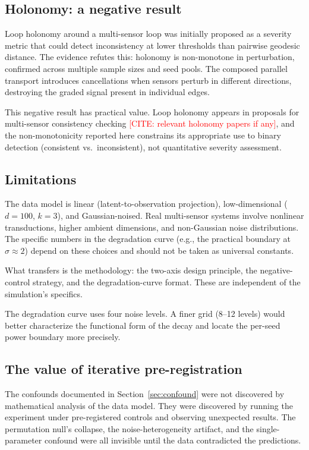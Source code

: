 \documentclass[11pt]{article}
\begin{document}
\subsection{Holonomy: a negative result}

Loop holonomy around a multi-sensor loop was initially proposed as
a severity metric that could detect inconsistency at lower
thresholds than pairwise geodesic distance.  The evidence refutes
this: holonomy is non-monotone in perturbation, confirmed across
multiple sample sizes and seed pools.  The composed parallel
transport introduces cancellations when sensors perturb in
different directions, destroying the graded signal present in
individual edges.

This negative result has practical value.  Loop holonomy appears in
proposals for multi-sensor consistency checking
\textcolor{red}{[CITE: relevant holonomy papers if any]}, and the
non-monotonicity reported here constrains its appropriate use to
binary detection (consistent vs.\ inconsistent), not quantitative
severity assessment.

\subsection{Limitations}

The data model is linear (latent-to-observation projection),
low-dimensional ($d = 100$, $k = 3$), and Gaussian-noised.  Real
multi-sensor systems involve nonlinear transductions, higher
ambient dimensions, and non-Gaussian noise distributions.  The
specific numbers in the degradation curve (e.g., the practical
boundary at $\sigma \approx 2$) depend on these choices and should
not be taken as universal constants.

What transfers is the methodology: the two-axis design principle,
the negative-control strategy, and the degradation-curve format.
These are independent of the simulation's specifics.

The degradation curve uses four noise levels.  A finer grid (8--12
levels) would better characterize the functional form of the
decay and locate the per-seed power boundary more precisely.

\subsection{The value of iterative pre-registration}

The confounds documented in Section~\ref{sec:confound} were not
discovered by mathematical analysis of the data model.  They were
discovered by running the experiment under pre-registered controls
and observing unexpected results.  The permutation null's collapse,
the noise-heterogeneity artifact, and the single-parameter
confound were all invisible until the data contradicted the
predictions.
\end{document}
